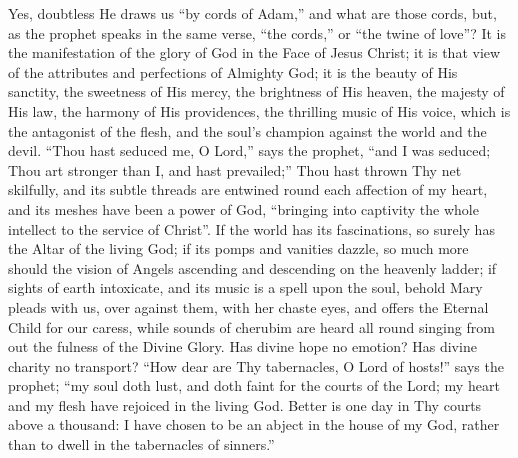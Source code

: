 Yes, doubtless He draws us ``by cords of Adam,'' and what
are those cords, but, as the prophet speaks in the same verse,
``the cords,'' or ``the twine of love''? It is the
manifestation of the glory of God in the Face of Jesus Christ; it is
that view of the attributes and perfections of Almighty God; it is the
beauty of His sanctity, the sweetness of His mercy, the brightness of
His heaven, the majesty of His law, the harmony of His providences,
the thrilling music of His voice, which is the antagonist of the
flesh, and the soul's champion against the world and the devil.
``Thou hast seduced me, O Lord,'' says the prophet, ``and
I was seduced; Thou art stronger than I, and hast prevailed;''
Thou hast thrown Thy net skilfully, and its subtle threads are
entwined round each affection of my heart, and its meshes have been a
power of God, ``bringing into captivity the whole intellect to the
service of Christ''. If the world has its fascinations, so surely
has the Altar of the living God; if its pomps and vanities dazzle, so
much more should the vision of Angels ascending and descending on the
heavenly ladder; if sights of earth intoxicate, and its music is a
spell upon the soul, behold Mary pleads with us, over against them,
with her chaste eyes, and offers the Eternal Child for our caress,
while sounds of cherubim are heard all round singing from out the
fulness of the Divine Glory. Has divine hope no emotion? Has divine
charity no transport? ``How dear are Thy tabernacles, O Lord of
hosts!'' says the prophet; ``my soul doth lust, and doth faint
for the courts of the Lord; my heart and my flesh have rejoiced in the
living God. Better is one day in Thy courts above a thousand: I have
chosen to be an abject in the house of my God, rather than to dwell in
the tabernacles of sinners.''

